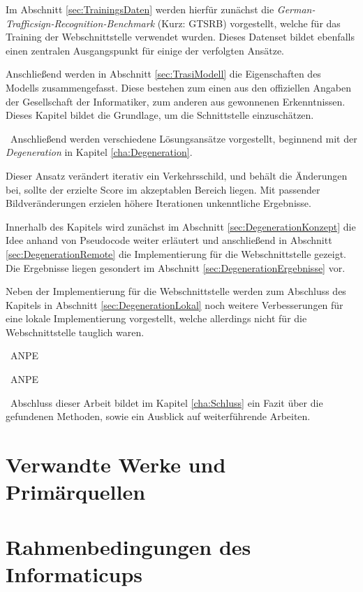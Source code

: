Im Abschnitt \ref{sec:TrainingsDaten} werden hierfür zunächst die \textit{German-Trafficsign-Recognition-Benchmark} (Kurz: GTSRB) vorgestellt, welche für das Training der Webschnittstelle verwendet wurden. Dieses Datenset bildet ebenfalls einen zentralen Ausgangspunkt für einige der verfolgten Ansätze.

Anschließend werden in Abschnitt \ref{sec:TrasiModell} die Eigenschaften des Modells zusammengefasst. 
Diese bestehen zum einen aus den offiziellen Angaben der Gesellschaft der Informatiker, zum anderen aus gewonnenen Erkenntnissen. Dieses Kapitel bildet die Grundlage, um die Schnittstelle einzuschätzen. 

~\newline Anschließend werden verschiedene Lösungsansätze vorgestellt, beginnend mit der \textit{Degeneration} in Kapitel \ref{cha:Degeneration}. 

Dieser Ansatz verändert iterativ ein Verkehrsschild, und behält die Änderungen bei, sollte der erzielte Score im akzeptablen Bereich liegen. Mit passender Bildveränderungen erzielen höhere Iterationen unkenntliche Ergebnisse. 

Innerhalb des Kapitels wird zunächst im Abschnitt \ref{sec:DegenerationKonzept} die Idee anhand von Pseudocode weiter erläutert und anschließend in Abschnitt  \ref{sec:DegenerationRemote} die Implementierung für die Webschnittstelle gezeigt. Die Ergebnisse liegen gesondert im Abschnitt \ref{sec:DegenerationErgebnisse} vor. 

Neben der Implementierung für die Webschnittstelle werden zum Abschluss des Kapitels in Abschnitt \ref{sec:DegenerationLokal} noch weitere Verbesserungen für eine lokale Implementierung vorgestellt, welche allerdings nicht für die Webschnittstelle tauglich waren.

~\newline ANPE 

~\newline ANPE 

~\newline Abschluss dieser Arbeit bildet im Kapitel \ref{cha:Schluss} ein Fazit über die gefundenen Methoden, sowie ein Ausblick auf weiterführende Arbeiten. 
\section{Verwandte Werke und Primärquellen}
\label{sec:VerwandteWerke}

\section{Rahmenbedingungen des Informaticups}
